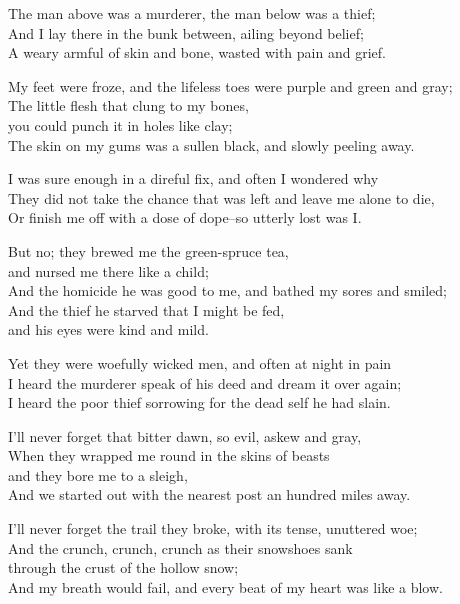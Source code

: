 
\begin{poemblock}
The man above was a murderer, the man below was a thief;\\
And I lay there in the bunk between, ailing beyond belief;\\
A weary armful of skin and bone, wasted with pain and grief.

My feet were froze, and the lifeless toes were purple and green and gray;\\
The little flesh that clung to my bones,\\
\idt you could punch it in holes like clay;\\
The skin on my gums was a sullen black, and slowly peeling away.

I was sure enough in a direful fix, and often I wondered why\\
They did not take the chance that was left and leave me alone to die,\\
Or finish me off with a dose of dope--so utterly lost was I.

But no; they brewed me the green-spruce tea,\\
\idt and nursed me there like a child;\\
And the homicide he was good to me, and bathed my sores and smiled;\\
And the thief he starved that I might be fed,\\
\idt and his eyes were kind and mild.

Yet they were woefully wicked men, and often at night in pain\\
I heard the murderer speak of his deed and dream it over again;\\
I heard the poor thief sorrowing for the dead self he had slain.

I'll never forget that bitter dawn, so evil, askew and gray,\\
When they wrapped me round in the skins of beasts\\
\idt and they bore me to a sleigh,\\
And we started out with the nearest post an hundred miles away.

I'll never forget the trail they broke, with its tense, unuttered woe;\\
And the crunch, crunch, crunch as their snowshoes sank\\
\idt through the crust of the hollow snow;\\
And my breath would fail, and every beat of my heart was like a blow.


\end{poemblock}
